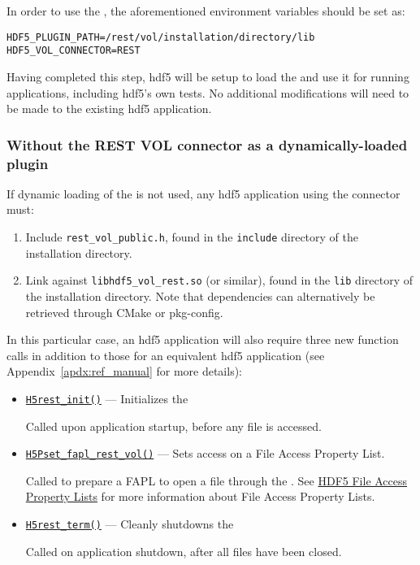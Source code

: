 \documentclass[../users_guide.tex]{subfiles}
\begin{document}
In order to use the \rvc{}, the aforementioned environment variables 
should be set as:

\begin{verbatim}
HDF5_PLUGIN_PATH=/rest/vol/installation/directory/lib
HDF5_VOL_CONNECTOR=REST
\end{verbatim}

Having completed this step, \acrshort{hdf5} will be setup to load the \rvc{}
and use it for running applications, including \acrshort{hdf5}'s own tests.
No additional modifications will need to be made to the existing \acrshort{hdf5} application.

\subsubsection{Without the REST VOL connector as a dynamically-loaded plugin}

If dynamic loading of the \rvc{} is not used, any \acrshort{hdf5} application
using the connector must:
\begin{enumerate}
 \item Include \texttt{rest\_vol\_public.h}, found in the \texttt{include}
directory of the \rvc{} installation directory.
 \item Link against \texttt{libhdf5\_vol\_rest.so} (or similar), found in
the \texttt{lib} directory of the \rvc{} installation directory. Note that dependencies
can alternatively be retrieved through CMake or pkg-config.
\end{enumerate}

In this particular case, an \acrshort{hdf5} \rvc{} application will also require three new
function calls in addition to those for an equivalent \acrshort{hdf5} application (see
Appendix~\ref{apdx:ref_manual} for more details):

\begin{itemize}
 \item \texttt{\hyperref[ref:h5rest_init]{H5rest\_init()}} --- Initializes the \rvc{}

    Called upon application startup, before any file is accessed.

 \item \texttt{\hyperref[ref:h5pset_fapl_rest_vol]{H5Pset\_fapl\_rest\_vol()}} --- Sets \rvc{} access on a File Access Property List.

    Called to prepare a FAPL to open a file through the \rvc{}. See \href{https://support.hdfgroup.org/HDF5/Tutor/property.html#fa}{HDF5 File Access Property Lists} for more information about File Access Property Lists.

 \item \texttt{\hyperref[ref:h5rest_term]{H5rest\_term()}} --- Cleanly shutdowns the \rvc{}

    Called on application shutdown, after all files have been closed.
\end{itemize}
\end{document}
